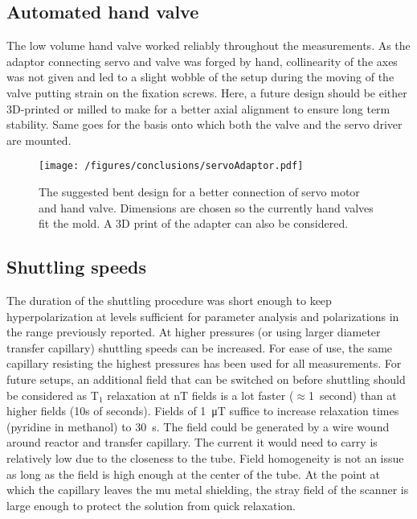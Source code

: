         \subsection{Automated hand valve}
            The low volume hand valve worked reliably throughout the measurements. As the adaptor connecting servo and valve was forged by hand, collinearity of the axes was not given and led to a slight wobble of the setup during the moving of the valve putting strain on the fixation screws. Here, a future design should be either 3D-printed or milled to make for a better axial alignment to ensure long term stability. Same goes for the basis onto which both the valve and the servo driver are mounted.
            \begin{figure}
                \centering
                \texttt{[image: /figures/conclusions/servoAdaptor.pdf]}
                \label{fig:conclusions:servoAdaptor}
                \caption[Servo adaptor]{The suggested bent design for a better connection of servo motor and hand valve. Dimensions are chosen so the currently hand valves fit the mold. A 3D print of the adapter can also be considered.}
            \end{figure}
        \subsection{Shuttling speeds}
        The duration of the shuttling procedure was short enough to keep hyperpolarization at levels sufficient for parameter analysis and polarizations in the range previously reported. At higher pressures (or using larger diameter transfer capillary) shuttling speeds can be increased. For ease of use, the same capillary resisting the highest pressures has been used for all measurements. For future setups, an additional field that can be switched on before shuttling should be considered as T$_1$ relaxation at \si{\nano\tesla} fields is a lot faster ($\approx$\SI{1}{second}) than at higher fields (10s of seconds). Fields of \SI{1}{\micro\tesla} suffice to increase relaxation times (pyridine in methanol) to \SI{30}{\second}. The field could be generated by a wire wound around reactor and transfer capillary. The current it would need to carry is relatively low due to the closeness to the tube. Field homogeneity is not an issue as long as the field is high enough at the center of the tube. At the point at which the capillary leaves the mu metal shielding, the stray field of the scanner is large enough to protect the solution from quick relaxation.
